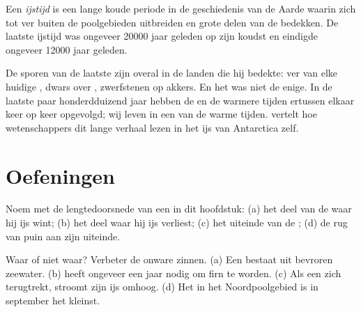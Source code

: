 \begin{definition}[IJstijd]\label{def:g8:ice-on-earth:ice-age}
Een \emph{ijstijd} is een lange koude periode in de
geschiedenis van de Aarde waarin  zich tot ver buiten de
poolgebieden uitbreiden en grote delen van de  bedekken. De
laatste ijstijd was ongeveer \num{20000} jaar geleden op zijn koudst en
eindigde ongeveer \num{12000} jaar geleden.
\end{definition}

De sporen van de laatste  zijn overal in de landen die hij bedekte:
 ver van elke huidige ,  dwars over ,
zwerfstenen op akkers. En het was niet de enige. In de laatste paar
honderdduizend jaar hebben de  en de warmere tijden ertussen
elkaar keer op keer opgevolgd; wij leven in een van de warme tijden.
 vertelt hoe wetenschappers dit
lange verhaal lezen in het ijs van Antarctica zelf.

\section{Oefeningen}

\begin{exercise}[$\star$]\label{exo:g8:ice-on-earth:1}
Noem met de lengtedoorsnede van een  in dit hoofdstuk: (a) het
deel van de  waar hij ijs wint; (b) het deel waar hij ijs
verliest; (c) het uiteinde van de ; (d) de rug van puin aan zijn
uiteinde.
\end{exercise}

\begin{exercise}[$\star$]\label{exo:g8:ice-on-earth:2}
Waar of niet waar? Verbeter de onware zinnen. (a) Een  bestaat uit
bevroren zeewater. (b)  heeft ongeveer een jaar nodig om firn te
worden. (c) Als een  zich terugtrekt, stroomt zijn ijs omhoog.
(d) Het  in het Noordpoolgebied is in september het kleinst.
\end{exercise}

